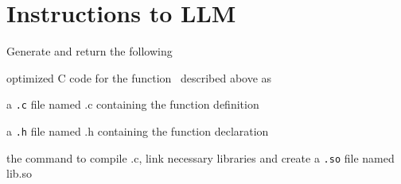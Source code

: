 \section{Instructions to LLM}

Generate and return the following 
\be
\item optimized C code for the function \cfunc\ described above as
  \be
\item a {\tt .c} file named {\cfunc}.c
  containing the function definition
\item a {\tt .h} file named {\cfunc}.h
  containing the function declaration
  \ee
\item the command to compile {\cfunc}.c, link necessary libraries and create a
  {\tt .so} file named lib{\cfunc}.so
  \ee


